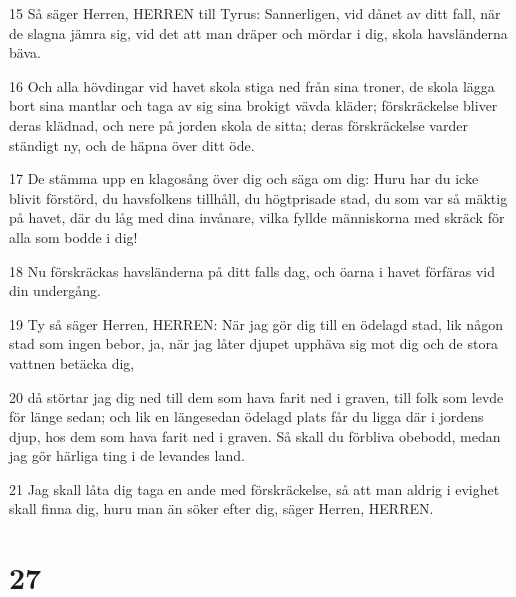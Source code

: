 \par 15 Så säger Herren, HERREN till Tyrus: Sannerligen, vid dånet av ditt fall, när de slagna jämra sig, vid det att man dräper och mördar i dig, skola havsländerna bäva.
\par 16 Och alla hövdingar vid havet skola stiga ned från sina troner, de skola lägga bort sina mantlar och taga av sig sina brokigt vävda kläder; förskräckelse bliver deras klädnad, och nere på jorden skola de sitta; deras förskräckelse varder ständigt ny, och de häpna över ditt öde.
\par 17 De stämma upp en klagosång över dig och säga om dig: Huru har du icke blivit förstörd, du havsfolkens tillhåll, du högtprisade stad, du som var så mäktig på havet, där du låg med dina invånare, vilka fyllde människorna med skräck för alla som bodde i dig!
\par 18 Nu förskräckas havsländerna på ditt falls dag, och öarna i havet förfäras vid din undergång.
\par 19 Ty så säger Herren, HERREN: När jag gör dig till en ödelagd stad, lik någon stad som ingen bebor, ja, när jag låter djupet upphäva sig mot dig och de stora vattnen betäcka dig,
\par 20 då störtar jag dig ned till dem som hava farit ned i graven, till folk som levde för länge sedan; och lik en längesedan ödelagd plats får du ligga där i jordens djup, hos dem som hava farit ned i graven. Så skall du förbliva obebodd, medan jag gör härliga ting i de levandes land.
\par 21 Jag skall låta dig taga en ande med förskräckelse, så att man aldrig i evighet skall finna dig, huru man än söker efter dig, säger Herren, HERREN.

\chapter{27}

